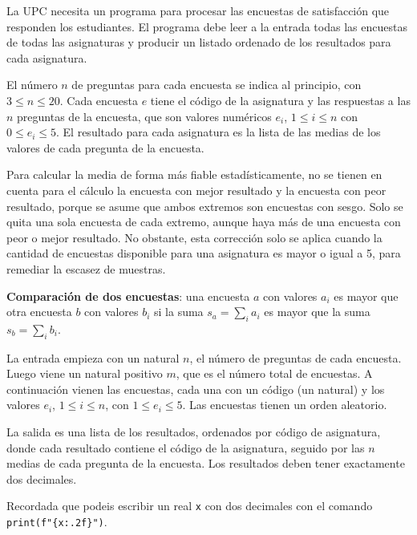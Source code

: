 

\Statement

La UPC necesita un programa para procesar las encuestas de satisfacción que responden los estudiantes. El programa debe leer a la entrada todas las encuestas de todas las asignaturas y producir un listado ordenado de los resultados para cada asignatura.

\medskip

El número $n$ de preguntas para cada encuesta se indica al principio, con $3 \leq n \leq 20$. Cada encuesta $e$ tiene el código de la asignatura y las respuestas a las $n$ preguntas de la encuesta, que son valores numéricos $e_i$, $1 \leq i \leq n$ con $0 \leq e_i \leq 5$. El resultado para cada asignatura es la lista de las medias de los valores de cada pregunta de la encuesta.

\medskip

Para calcular la media de forma más fiable estadísticamente, no se tienen en cuenta para el cálculo la encuesta con mejor resultado y la encuesta con peor resultado, porque se asume que ambos extremos son encuestas con sesgo. Solo se quita una sola encuesta de cada extremo, aunque haya más de una encuesta con peor o mejor resultado. No obstante, esta corrección solo se aplica cuando la cantidad de encuestas disponible para una asignatura es mayor o igual a 5, para remediar la escasez de muestras.

\medskip

\textbf{Comparación de dos encuestas}: una encuesta $a$ con valores $a_i$ es mayor que otra encuesta $b$ con valores $b_i$ si la suma $s_a = \sum_{i} a_i$ es mayor que la suma $s_b = \sum_{i} b_i$.

\Input

La entrada empieza con un natural $n$, el número de preguntas de cada encuesta. Luego viene un natural positivo $m$, que es el número total de encuestas. A continuación vienen las encuestas, cada una con un código (un natural) y los valores $e_i$, $1 \leq i \leq n$, con $1 \leq e_i \leq 5$. Las encuestas tienen un orden aleatorio.

\Output

La salida es una lista de los resultados, ordenados por código de asignatura, donde cada resultado contiene el código de la asignatura, seguido por las $n$ medias de cada pregunta de la encuesta. Los resultados deben tener exactamente dos decimales.

\Observation

Recordada que podeis escribir un real \texttt{x} con dos decimales con el comando \texttt{print(f"\{x:.2f\}")}.

\Sample

